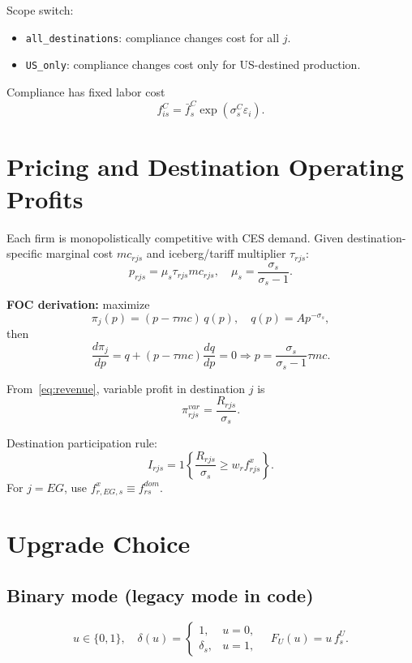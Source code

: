 \documentclass[11pt]{article}
\begin{document}
Scope switch:
\begin{itemize}
    \item \texttt{all\_destinations}: compliance changes cost for all $j$.
    \item \texttt{US\_only}: compliance changes cost only for US-destined production.
\end{itemize}

Compliance has fixed labor cost
\begin{equation}
f^C_{is} = \bar f^C_s \exp(\sigma^C_s \varepsilon_i).
\label{eq:comp_cost}
\end{equation}

\section{Pricing and Destination Operating Profits}
Each firm is monopolistically competitive with CES demand.
Given destination-specific marginal cost $mc_{rjs}$ and iceberg/tariff multiplier $\tau_{rjs}$:
\begin{equation}
p_{rjs} = \mu_s \tau_{rjs} mc_{rjs},
\quad
\mu_s = \frac{\sigma_s}{\sigma_s-1}.
\label{eq:markup_price}
\end{equation}

\textbf{FOC derivation:} maximize
\[
\pi_j(p)= (p-\tau mc)\,q(p),\quad q(p)=A p^{-\sigma_s},
\]
then
\[
\frac{d\pi_j}{dp}=q + (p-\tau mc)\frac{dq}{dp}=0
\Rightarrow
p=\frac{\sigma_s}{\sigma_s-1}\tau mc.
\]

From~\eqref{eq:revenue}, variable profit in destination $j$ is
\begin{equation}
\pi^{var}_{rjs} = \frac{R_{rjs}}{\sigma_s}.
\label{eq:var_profit}
\end{equation}

Destination participation rule:
\begin{equation}
I_{rjs}=1\left\{\frac{R_{rjs}}{\sigma_s}\ge w_r f^x_{rjs}\right\}.
\label{eq:dest_entry}
\end{equation}
For $j=EG$, use $f^x_{r,EG,s}\equiv f^{dom}_{rs}$.

\section{Upgrade Choice}
\subsection{Binary mode (legacy mode in code)}
\[
u\in\{0,1\},\quad
\delta(u)=
\begin{cases}
1,& u=0,\\
\delta_s,& u=1,
\end{cases}
\quad
F_U(u)=u\,f^U_s.
\]
\end{document}
